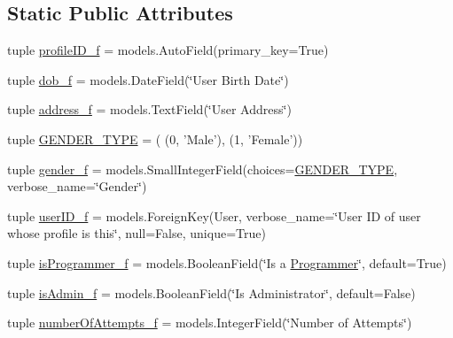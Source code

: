 \subsection*{Static Public Attributes}
\begin{DoxyCompactItemize}
\item 
tuple \hyperlink{class_ecodena_1_1_user_1_1models_1_1_profile_ae4b22732124303ac690d9d6347f8888b}{profileID\_\-f} = models.AutoField(primary\_\-key=True)
\item 
tuple \hyperlink{class_ecodena_1_1_user_1_1models_1_1_profile_aa21eaecc5ddfe2d63af834e8872bbae5}{dob\_\-f} = models.DateField(\char`\"{}User Birth Date\char`\"{})
\item 
tuple \hyperlink{class_ecodena_1_1_user_1_1models_1_1_profile_ad435c6b65d26e301bf02a029a83b6a5a}{address\_\-f} = models.TextField(\char`\"{}User Address\char`\"{})
\item 
tuple \hyperlink{class_ecodena_1_1_user_1_1models_1_1_profile_ab5f64a30a5708c602dd1eef94ccd811d}{GENDER\_\-TYPE} = ( (0, 'Male'), (1, 'Female'))
\item 
tuple \hyperlink{class_ecodena_1_1_user_1_1models_1_1_profile_ab5e59193a1b014e2f6ce017850bbc429}{gender\_\-f} = models.SmallIntegerField(choices=\hyperlink{class_ecodena_1_1_user_1_1models_1_1_profile_ab5f64a30a5708c602dd1eef94ccd811d}{GENDER\_\-TYPE}, verbose\_\-name=\char`\"{}Gender\char`\"{})
\item 
tuple \hyperlink{class_ecodena_1_1_user_1_1models_1_1_profile_a2459a7c3980469d894a491c4aa5e72e1}{userID\_\-f} = models.ForeignKey(User, verbose\_\-name=\char`\"{}User ID of user whose profile is this\char`\"{}, null=False, unique=True)
\item 
tuple \hyperlink{class_ecodena_1_1_user_1_1models_1_1_profile_ab696510431c027177451da1e4a6bdc0b}{isProgrammer\_\-f} = models.BooleanField(\char`\"{}Is a \hyperlink{class_ecodena_1_1_user_1_1models_1_1_programmer}{Programmer}\char`\"{}, default=True)
\item 
tuple \hyperlink{class_ecodena_1_1_user_1_1models_1_1_profile_ada687883f8de1aa44a0feee2448b61b8}{isAdmin\_\-f} = models.BooleanField(\char`\"{}Is Administrator\char`\"{}, default=False)
\item 
tuple \hyperlink{class_ecodena_1_1_user_1_1models_1_1_profile_a7cfe404d70a33ce89be1a5d51c9cafba}{numberOfAttempts\_\-f} = models.IntegerField(\char`\"{}Number of Attempts\char`\"{})
\end{DoxyCompactItemize}
